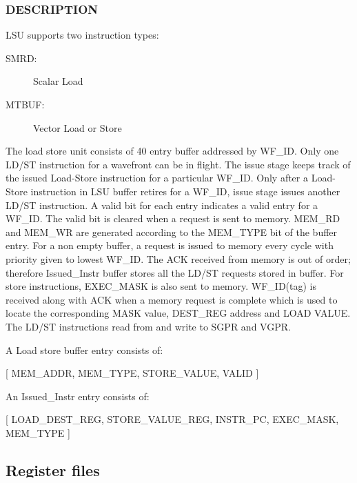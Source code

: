 \documentclass{article}
\begin{document}
\subsubsection{DESCRIPTION}
LSU supports two instruction types:
\begin{description}
\item[SMRD: ] Scalar Load
\item[MTBUF: ] Vector Load or Store
\end{description}
The load store unit consists of 40 entry buffer addressed by WF\_ID. Only one LD/ST instruction for a wavefront can be in flight. The issue stage keeps track of the issued Load-Store instruction for a particular WF\_ID. Only after a Load-Store instruction in LSU buffer retires for a WF\_ID, issue stage issues another LD/ST instruction. A valid bit for each entry indicates a valid entry for a WF\_ID. The valid bit is cleared when a request is sent to memory. MEM\_RD and MEM\_WR are generated according to the MEM\_TYPE bit of the buffer entry. For a non empty buffer, a request is issued to memory every cycle with priority given to lowest WF\_ID. The ACK received from memory is out of order; therefore Issued\_Instr buffer stores all the LD/ST requests stored in buffer. For store instructions, EXEC\_MASK is also sent to memory. WF\_ID(tag) is received along with ACK when a memory request is complete which is used to locate the corresponding MASK value, DEST\_REG address and LOAD VALUE. The LD/ST instructions read from and write to SGPR and VGPR.\\

\vspace{1 mm}

 A Load store buffer entry consists of: 

[ MEM\_ADDR, MEM\_TYPE, STORE\_VALUE, VALID ]\\

\vspace{1 mm} 
 
An Issued\_Instr entry consists of: 

[ LOAD\_DEST\_REG, STORE\_VALUE\_REG, INSTR\_PC, EXEC\_MASK, MEM\_TYPE ]
\subsection{Register files}
\subsubsection{vGPR}
\subsubsection{sGPR}
\end{document}
